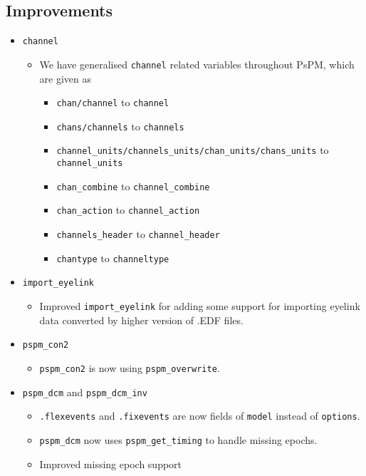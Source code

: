 \documentclass[english]{article}
\numberwithin{equation}{section}
\numberwithin{figure}{section}
\begin{document}
\subsection*{Improvements}
    \begin{itemize}
    	\item \texttt{channel}
    	\begin{itemize}
    		\item We have generalised \texttt{channel} related variables throughout PsPM, which are given as 
    		\begin{itemize}
    			\item \texttt{chan/channel} to \texttt{channel}
    			\item \texttt{chans/channels} to \texttt{channels}
    			\item \texttt{channel\_units/channels\_units/chan\_units/chans\_units} to \texttt{channel\_units}
    			\item \texttt{chan\_combine} to \texttt{channel\_combine}
    			\item \texttt{chan\_action} to \texttt{channel\_action}
    			\item \texttt{channels\_header} to \texttt{channel\_header}
    			\item \texttt{chantype} to \texttt{channeltype}
    		\end{itemize}
			\end{itemize}
    	\item \texttt{import\_eyelink}
    	\begin{itemize}
    		\item Improved \texttt{import\_eyelink} for adding some support for importing eyelink 
    					data converted by higher version of .EDF files.
    	\end{itemize}
    	\item \texttt{pspm\_con2}
    	\begin{itemize}
    		\item \texttt{pspm\_con2} is now using \texttt{pspm\_overwrite}.
    	\end{itemize}
    	\item \texttt{pspm\_dcm} and \texttt{pspm\_dcm\_inv}
    	\begin{itemize}
    		\item \texttt{.flexevents} and \texttt{.fixevents} are now fields of \texttt{model} instead of \texttt{options}.
    		\item \texttt{pspm\_dcm} now uses \texttt{pspm\_get\_timing} to handle missing epochs.
    		\item Improved missing epoch support

\end{itemize}
\end{itemize}
\end{document}
